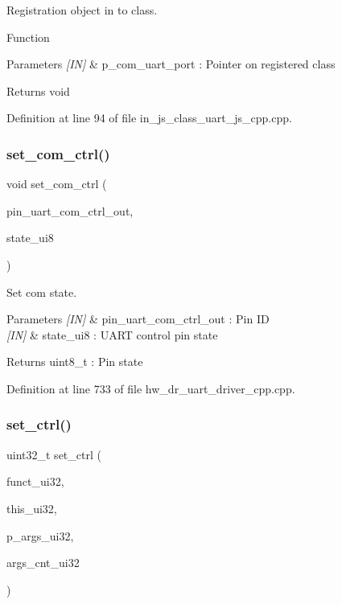 Registration object in to class. 

Function
\begin{DoxyParams}{Parameters}
{\em \mbox{[}\+I\+N\mbox{]}} & p\+\_\+com\+\_\+uart\+\_\+port \+: Pointer on registered class \\
\hline
\end{DoxyParams}
\begin{DoxyReturn}{Returns}
void 
\end{DoxyReturn}


Definition at line 94 of file in\+\_\+js\+\_\+class\+\_\+uart\+\_\+js\+\_\+cpp.\+cpp.

\mbox{\label{group___u_a_r_t_ga1ed6cd4425396c2c3f4577057db3acb9}} 
\subsubsection{set\_com\_ctrl()}
{\footnotesize\ttfamily void set\+\_\+com\+\_\+ctrl (\begin{DoxyParamCaption}\item[{uart\+\_\+com\+\_\+ctrl\+\_\+out\+\_\+t}]{pin\+\_\+uart\+\_\+com\+\_\+ctrl\+\_\+out,  }\item[{uint8\+\_\+t}]{state\+\_\+ui8 }\end{DoxyParamCaption})}



Set com state. 


\begin{DoxyParams}{Parameters}
{\em \mbox{[}\+I\+N\mbox{]}} & pin\+\_\+uart\+\_\+com\+\_\+ctrl\+\_\+out \+: Pin ID \\
\hline
{\em \mbox{[}\+I\+N\mbox{]}} & state\+\_\+ui8 \+: U\+A\+RT control pin state \\
\hline
\end{DoxyParams}
\begin{DoxyReturn}{Returns}
uint8\+\_\+t \+: Pin state 
\end{DoxyReturn}


Definition at line 733 of file hw\+\_\+dr\+\_\+uart\+\_\+driver\+\_\+cpp.\+cpp.

\mbox{\label{group___u_a_r_t_ga212f0e8c05652caad919b232392fa451}} 
\subsubsection{set\_ctrl()}
{\footnotesize\ttfamily uint32\+\_\+t set\+\_\+ctrl (\begin{DoxyParamCaption}\item[{const uint32\+\_\+t}]{funct\+\_\+ui32,  }\item[{const uint32\+\_\+t}]{this\+\_\+ui32,  }\item[{const uint32\+\_\+t $\ast$}]{p\+\_\+args\+\_\+ui32,  }\item[{const uint32\+\_\+t}]{args\+\_\+cnt\+\_\+ui32 }\end{DoxyParamCaption})\hspace{0.3cm}{\ttfamily [static]}}



